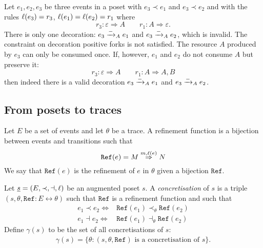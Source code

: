 \begin{example}
  Let $e_1,e_2,e_3$ be three events in a poset with $e_3\prec e_1$ and $e_3\prec e_2$ and with the rules $\ell(e_3)=r_3$, $\ell(e_1)=\ell(e_2)=r_1$ where
  \[
  r_3: \varepsilon \Rightarrow A\qquad r_1: A\Rightarrow \varepsilon.
  \]
  There is only one decoration: $e_3\mathrel{\xrightarrow{-}}_{A} e_1$ and $e_3\mathrel{\xrightarrow{-}}_{A} e_2$, which is invalid. The constraint on decoration positive forks is not satisfied. The resource $A$ produced by $e_3$ can only be consumed once.
  If, however, $e_1$ and $e_2$ do not consume $A$ but preserve it:
  \[
  r_3: \varepsilon \Rightarrow A\qquad r_1: A\Rightarrow A,B
  \]
  then indeed there is a valid decoration $e_3\mathrel{\xrightarrow{-}}_{A} e_1$ and $e_3\mathrel{\xrightarrow{-}}_{A} e_2$.
\end{example}

\subsection{From posets to traces}
\label{sec:refinement}

\begin{definition}
  Let $E$ be a set of events and let $\theta$ be a trace. A refinement function is a bijection between events and transitions such that
  \[
  \mathtt{Ref}(e) = M\overset{m,\ell(e)}{\Rightarrow}N
  \]
  We say that $\mathtt{Ref}(e)$ is the refinement of $e$ in $\theta$ given a bijection $\mathtt{Ref}$.
\end{definition}

\begin{definition}
  \label{def:concret}
  Let $\underline s=(E,\prec,\dashv,\ell)$ be an augmented poset $s$.
  A \emph{concretisation} of $s$ is a triple $(s,\theta,\mathtt{Ref}:E\leftrightarrow\theta)$ such that $\mathtt{Ref}$ is a refinement function and such that
  \begin{align*}
    e_1\prec e_2 \iff& \mathtt{Ref}(e_1) \prec_{\theta}\mathtt{Ref}(e_2)\\
    e_1\dashv e_2 \iff& \mathtt{Ref}(e_1) \dashv_{\theta}\mathtt{Ref}(e_2)
  \end{align*}
  Define $\gamma(s)$ to be the set of all concretisations of $s$:
  \begin{align*}
    \gamma(s) = \{\theta: (s,\theta,\mathtt{Ref})\text{ is a concretisation of }s\}.
  \end{align*}
\end{definition}

